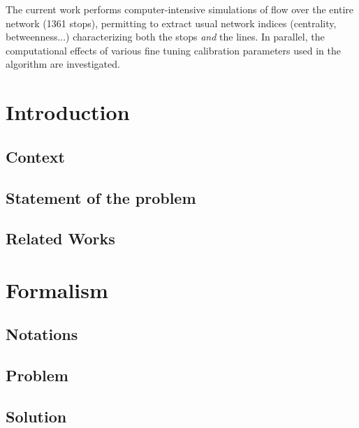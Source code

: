 \documentclass{bmcart}
\begin{document}
{\vspace*{0.2cm}

The current work performs computer-intensive simulations of flow over the entire network (1361 stops), permitting to extract usual network indices (centrality, betweenness...) characterizing both the stops \emph{and} the lines. In parallel, the computational effects of various fine tuning calibration parameters used in the algorithm are investigated. 




 

\section{Introduction}

\subsection{Context}

\subsection{Statement of the problem}

\subsection{Related Works}


\section{Formalism}

\subsection{Notations}

\subsection{Problem}

\subsection{Solution}


}
\end{document}

